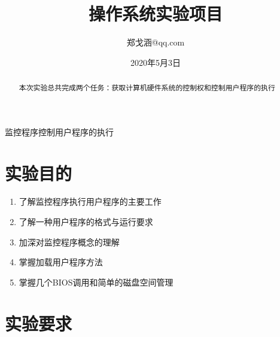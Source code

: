 \documentclass[a4paper, 11pt]{article} %
\title{\textbf{操作系统实验项目}\\ %
} %
\author{郑戈涵\quad 17338233\quad 931252924@qq.com} %
\date{2020年5月3日} %
\makeatletter
\renewcommand{\maketitle}{ %
\begin{center} %
{\LARGE\@title} %

\large{\@subtitle}

\vspace{1em} %

{\large\@author} %

\end{center}
}
\newcommand\@subtitle{监控程序控制用户程序的执行}
\makeatother
\begin{document}
\maketitle %


\renewcommand{\abstractname}{摘要} %

\begin{abstract}
  本次实验总共完成两个任务：获取计算机硬件系统的控制权和控制用户程序的执行
\end{abstract}


\vspace{1em} %

\setcounter{tocdepth}{2}
\renewcommand{\contentsname}{目录}
\tableofcontents


\pagebreak

\section{实验目的}

\begin{enumerate}
  \item 了解监控程序执行用户程序的主要工作
  \item 了解一种用户程序的格式与运行要求
  \item 加深对监控程序概念的理解
  \item 掌握加载用户程序方法
  \item 掌握几个BIOS调用和简单的磁盘空间管理
\end{enumerate}


\section{实验要求}
\end{document}
